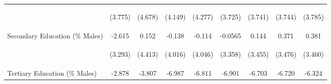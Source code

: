 \begin{landscape}
\begin{table}[htpb!]
\begin{center}
\begin{tabular}{lcccccccc}
&\begin{footnotesize}(3.775)\end{footnotesize}&\begin{footnotesize}(4.678)\end{footnotesize}&\begin{footnotesize}(4.149)\end{footnotesize}&\begin{footnotesize}(4.277)\end{footnotesize}&\begin{footnotesize}(3.725)\end{footnotesize}&\begin{footnotesize}(3.741)\end{footnotesize}&\begin{footnotesize}(3.744)\end{footnotesize}&\begin{footnotesize}(3.785)\end{footnotesize}\\
Secondary Education (\% Males) &-2.615&0.152&-0.138&-0.114&-0.0565&0.144&0.371&0.381\\
&\begin{footnotesize}(3.293)\end{footnotesize}&\begin{footnotesize}(4.413)\end{footnotesize}&\begin{footnotesize}(4.016)\end{footnotesize}&\begin{footnotesize}(4.046)\end{footnotesize}&\begin{footnotesize}(3.358)\end{footnotesize}&\begin{footnotesize}(3.455)\end{footnotesize}&\begin{footnotesize}(3.476)\end{footnotesize}&\begin{footnotesize}(3.460)\end{footnotesize}\\
Tertiary Education (\% Males) &-2.878&-3.807&-6.987&-6.811&-6.901&-6.703&-6.720&-6.324\\

\end{tabular}
\end{center}
\end{table}
\end{landscape}
